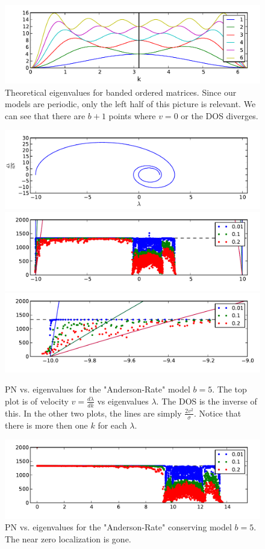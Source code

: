 \documentclass[onecolumn,fleqn]{revtex4}
\begin{document}
\begin{figure}[H]
\includegraphics{pta_theor_banded_ev}
\caption{Theoretical eigenvalues for banded ordered matrices. Since our 
models are periodic, only the left half of this picture is relevant.
We can see that there are $b+1$ points where $v=0$ or the DOS diverges.
}\label{fig:theor_banded_ev}
\end{figure}


\begin{figure}[H]
\includegraphics{pta_theor_banded_dos}
\includegraphics{pta_anderson_rates_b5}\\
\includegraphics{pta_anderson_rates_b5_zoom}
\caption{PN vs. eigenvalues for the "Anderson-Rate" model $b=5$.
 The top plot is of velocity $v=\frac{d\lambda}{dk}$ vs eigenvalues $\lambda$. The DOS is the inverse of this.
In the other two plots, the lines are simply $\frac{2 v^2}{\sigma}$. Notice that
there is more then one $k$ for each $\lambda$. 
}\label{fig:anderson_rate_b5}
\end{figure}

\begin{figure}[H]
\includegraphics{pta_anderson_rates_conserv_b5}
\caption{PN vs. eigenvalues for the "Anderson-Rate" conserving model $b=5$.
The near zero localization is gone.
}\label{fig:anderson_rate_conserv_b5}
\end{figure}
\end{document}
